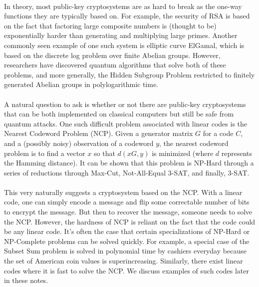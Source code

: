 \documentclass[12pt]{article}
\theoremstyle{definition}
\begin{document}
\paragraph{}
In theory, most public-key cryptosystems are as hard to break as the one-way functions they are typically based on. For example, the security of RSA is based on the fact that factoring large composite numbers is (thought to be) exponentially harder than generating and multiplying large primes. Another commonly seen example of one such system is elliptic curve ElGamal, which is based on the discrete log problem over finite Abelian groups. However, researchers have discovered quantum algorithms that solve both of these problems, and more generally, the Hidden Subgroup Problem restricted to finitely generated Abelian groups in polylogarithmic time.

\paragraph{}
A natural question to ask is whether or not there are public-key cryptosystems that can be both implemented on classical computers but still be safe from quantum attacks. One such difficult problem associated with linear codes is the Nearest Codeword Problem (NCP). Given a generator matrix $G$ for a code $C$, and a (possibly noisy) observation of a codeword $y$, the nearest codeword problem is to find a vector $x$ so that $d(xG, y)$ is minimized (where $d$ represents the Hamming distance). It can be shown that this problem is NP-Hard through a series of reductions through Max-Cut, Not-All-Equal 3-SAT, and finally, 3-SAT.

\paragraph{}
This very naturally suggests a cryptosystem based on the NCP. With a linear code, one can simply encode a message and flip some correctable number of bits to encrypt the message. But then to recover the message, someone needs to solve the NCP. However, the hardness of NCP is reliant on the fact that the code could be any linear code. It's often the case that certain specializations of NP-Hard or NP-Complete problems can be solved quickly. For example, a special case of the Subset Sum problem is solved in polynomial time by cashiers everyday because the set of American coin values is superincreasing. Similarly, there exist linear codes where it is fast to solve the NCP. We discuss examples of such codes later in these notes. 
\end{document}
